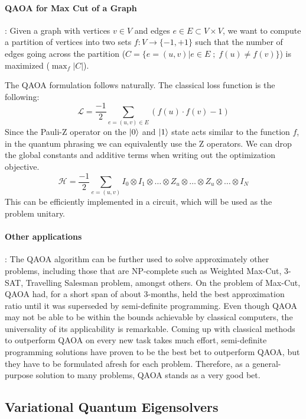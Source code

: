 \paragraph*{QAOA for Max Cut of a Graph}: Given a graph with vertices $v \in V$ and edges $e \in E \subset V \times V$, we want to compute a partition of vertices into two sets $f: V \rightarrow \{-1, +1\}$ such that the number of edges going across the partition ($C = \{ e = (u, v) | e \in E \;;\; f(u) \neq f(v) \}$) is maximized ($\max_{f} |C|$).

The QAOA formulation follows naturally. The classical loss function is the following:
\begin{equation}
    \mathcal{L} = \frac{-1}{2} \sum_{e = (u, v) \in E} (f(u) \cdot f(v) - 1)
\end{equation}
Since the Pauli-Z operator on the $\ket{0}$ and $\ket{1}$ state acts similar to the function $f$, in the quantum phrasing we can equivalently use the Z operators. We can drop the global constants and additive terms when writing out the optimization objective.
\begin{equation}
    \mathcal{H} = \frac{-1}{2} \sum_{e = (u, v)} I_0 \otimes I_1 \otimes \ldots \otimes Z_u \otimes \ldots \otimes Z_u \otimes \ldots \otimes I_N
\end{equation}
This can be efficiently implemented in a circuit, which will be used as the problem unitary.

\paragraph*{Other applications}: The QAOA algorithm can be further used to solve approximately other problems, including those that are NP-complete such as Weighted Max-Cut, 3-SAT, Travelling Salesman problem, amongst others. On the problem of Max-Cut, QAOA had, for a short span of about 3-months, held the best approximation ratio until it was superseded by semi-definite programming. Even though QAOA may not be able to be within the bounds achievable by classical computers, the universality of its applicability is remarkable. Coming up with classical methods to outperform QAOA on every new task takes much effort, semi-definite programming solutions have proven to be the best bet to outperform QAOA, but they have to be formulated afresh for each problem. Therefore, as a general-purpose solution to many problems, QAOA stands as a very good bet.


\subsection{Variational Quantum Eigensolvers}

